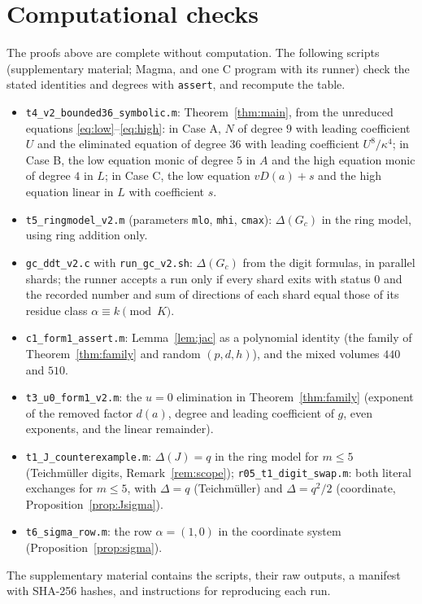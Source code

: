 \documentclass[11pt]{amsart}
\theoremstyle{definition}
\begin{document}
\appendix
\section{Computational checks}\label{app:cert}
The proofs above are complete without computation. The following scripts (supplementary material; Magma, and one C program with its runner) check the stated
identities and degrees with \texttt{assert}, and recompute the table.
\begin{itemize}
\item \texttt{t4\_v2\_bounded36\_symbolic.m}: Theorem~\ref{thm:main}, from the unreduced equations \eqref{eq:low}--\eqref{eq:high}:
in Case A, $N$ of degree $9$ with leading coefficient $U$ and the eliminated equation of degree $36$ with leading coefficient
$U^8/\kappa^4$; in Case B, the low equation monic of degree $5$ in $A$ and the high equation monic of degree $4$ in $L$; in Case C,
the low equation $vD(a)+s$ and the high equation linear in $L$ with coefficient $s$.
\item \texttt{t5\_ringmodel\_v2.m} (parameters \texttt{mlo}, \texttt{mhi}, \texttt{cmax}): $\Delta(G_c)$ in the ring model, using ring
addition only.
\item \texttt{gc\_ddt\_v2.c} with \texttt{run\_gc\_v2.sh}: $\Delta(G_c)$ from the digit formulas, in parallel shards; the runner accepts a
run only if every shard exits with status $0$ and the recorded number and sum of directions of each shard equal those of its residue
class $\alpha\equiv k\pmod K$.
\item \texttt{c1\_form1\_assert.m}: Lemma~\ref{lem:jac} as a polynomial identity (the family of Theorem~\ref{thm:family} and random
$(p,d,h)$), and the mixed volumes $440$ and $510$.
\item \texttt{t3\_u0\_form1\_v2.m}: the $u=0$ elimination in Theorem~\ref{thm:family} (exponent of the removed factor $d(a)$, degree and
leading coefficient of $g$, even exponents, and the linear remainder).
\item \texttt{t1\_J\_counterexample.m}: $\Delta(J)=q$ in the ring model for $m\le5$ (Teichm\"uller digits, Remark~\ref{rem:scope});
\texttt{r05\_t1\_digit\_swap.m}: both literal exchanges for $m\le5$, with $\Delta=q$ (Teichm\"uller) and $\Delta=q^2/2$ (coordinate,
Proposition~\ref{prop:Jsigma}).
\item \texttt{t6\_sigma\_row.m}: the row $\alpha=(1,0)$ in the coordinate system (Proposition~\ref{prop:sigma}).
\end{itemize}
The supplementary material contains the scripts, their raw outputs, a manifest with SHA-256 hashes, and instructions for
reproducing each run.
\end{document}
